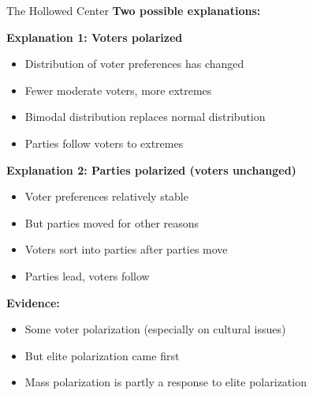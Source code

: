 \documentclass[10pt]{beamer}
\begin{document}
\begin{frame}[allowframebreaks]{The Hollowed Center}
\textbf{Two possible explanations:}
 
\textbf{Explanation 1: Voters polarized}
\begin{itemize}
\item Distribution of voter preferences has changed
\item Fewer moderate voters, more extremes
\item Bimodal distribution replaces normal distribution
\item Parties follow voters to extremes
\end{itemize}



\textbf{Explanation 2: Parties polarized (voters unchanged)}
\begin{itemize}
\item Voter preferences relatively stable
\item But parties moved for other reasons
\item Voters sort into parties after parties move
\item Parties lead, voters follow
\end{itemize}

   \framebreak 

\textbf{Evidence:}
\begin{itemize}
\item Some voter polarization (especially on cultural issues)
\item But \alert{elite polarization came first}
\item Mass polarization is partly a response to elite polarization
\end{itemize}
\end{frame}
\end{document}
